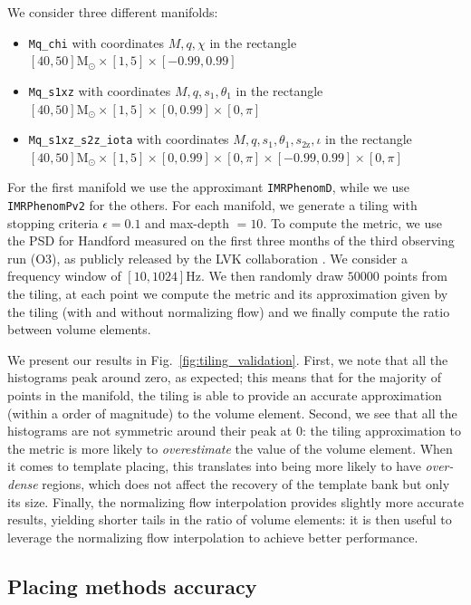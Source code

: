 \documentclass[twocolumn,showpacs,preprintnumbers,nofootinbib,prd,
superscriptaddress,10pt]{revtex4-2}
\begin{document}
We consider three different manifolds:
\begin{itemize}
	\item \texttt{Mq\_chi} with coordinates $M, q, \chi $ in the rectangle $[40, 50] \mathrm{M_\odot} \times [1,5] \times [-0.99, 0.99]$
	\item \texttt{Mq\_s1xz} with coordinates $M, q, s_{1}, \theta_1$ in the rectangle $[40, 50] \mathrm{M_\odot} \times [1,5] \times [0, 0.99] \times [0,\pi]$
	\item \texttt{Mq\_s1xz\_s2z\_iota} with coordinates $M, q, s_{1}, \theta_1, s_\text{2z}, \iota$ in the rectangle $[40, 50] \mathrm{M_\odot} \times [1,5] \times [0, 0.99] \times [0,\pi] \times [-0.99, 0.99] \times [0, \pi]$
\end{itemize}
For the first manifold we use the approximant \texttt{IMRPhenomD}, while we use \texttt{IMRPhenomPv2} for the others.
For each manifold, we generate a tiling with stopping criteria $\epsilon = 0.1$ and max-depth $= 10$.
To compute the metric, we use the PSD for Handford measured on the first three months of the third observing run (O3), as publicly released by the LVK collaboration \cite{O3a_PSDs}. We consider a frequency window of $[10, 1024] \text{Hz}$.
We then randomly draw $50000$ points from the tiling, at each point we compute the metric and its approximation given by the tiling (with and without normalizing flow) and we finally compute the ratio between volume elements.

We present our results in Fig.~\ref{fig:tiling_validation}.
First, we note that all the histograms peak around zero, as expected; this means that for the majority of points in the manifold, the tiling is able to provide an accurate approximation (within a order of magnitude) to the volume element.
Second, we see that all the histograms are not symmetric around their peak at $0$: the tiling approximation to the metric is more likely to {\it overestimate} the value of the volume element. When it comes to template placing, this translates into being more likely to have {\it over-dense} regions, which does not affect the recovery of the template bank but only its size.
Finally, the normalizing flow interpolation provides slightly more accurate results, yielding shorter tails in the ratio of volume elements: it is then useful to leverage the normalizing flow interpolation to achieve better performance.


\subsection{Placing methods accuracy} \label{sec:placing_accuracy}
\end{document}
